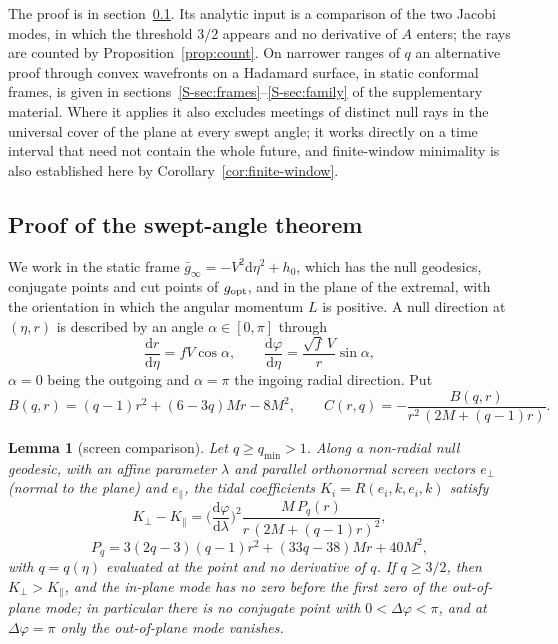 \documentclass[aip,jmp,amsmath,amssymb,reprint]{revtex4-2}
\newcommand{\dd}{\mathrm{d}}
\newcommand{\gopt}{g_{\rm opt}}
\theoremstyle{plain}
\newtheorem{lemma}[proposition]{Lemma}
\theoremstyle{definition}
\begin{document}
The proof is in section~\ref{sec:angle-proof}. Its analytic input is a comparison of the two
Jacobi modes, in which the threshold $3/2$ appears and no derivative of $A$ enters; the rays are
counted by Proposition~\ref{prop:count}. On narrower ranges of $q$ an alternative proof through
convex wavefronts on a Hadamard surface, in static conformal frames, is given in
sections~\ref{S-sec:frames}--\ref{S-sec:family} of the supplementary material. Where it applies it also excludes meetings of distinct null rays in the
universal cover of the plane at every swept angle; it works directly on a time interval that
need not contain the whole future, and finite-window minimality is also established here by
Corollary~\ref{cor:finite-window}.

\subsection{Proof of the swept-angle theorem}
\label{sec:angle-proof}
We work in the static frame $\bar g_\infty=-V^2\dd\eta^2+h_0$, which has the null geodesics,
conjugate points and cut points of $\gopt$, and in the plane of the extremal, with the
orientation in which the angular momentum $L$ is positive. A null direction at $(\eta,r)$ is
described by an angle $\alpha\in[0,\pi]$ through
\begin{equation}
  \frac{\dd r}{\dd\eta}=fV\cos\alpha,\qquad \frac{\dd\varphi}{\dd\eta}=\frac{\sqrt f\,V}{r}\sin\alpha,
  \label{eq:tk-alpha}
\end{equation}
$\alpha=0$ being the outgoing and $\alpha=\pi$ the ingoing radial direction. Put
\[
  B(q,r)=(q-1)r^2+(6-3q)Mr-8M^2,\qquad C(r,q)=-\frac{B(q,r)}{r^2\,(2M+(q-1)r)} .
\]

\begin{lemma}[screen comparison]\label{lem:tk-sturm}
Let $q\ge q_{\min}>1$. Along a non-radial null geodesic, with an affine parameter $\lambda$ and
parallel orthonormal screen vectors $e_\perp$ (normal to the plane) and $e_\parallel$, the tidal
coefficients $K_i=R(e_i,k,e_i,k)$ satisfy
\[
  K_\perp-K_\parallel=\Big(\frac{\dd\varphi}{\dd\lambda}\Big)^2\frac{M\,P_q(r)}{r\,(2M+(q-1)r)^2},
\]
\[
  P_q=3(2q-3)(q-1)r^2+(33q-38)Mr+40M^2,
\]
with $q=q(\eta)$ evaluated at the point and no derivative of $q$. If $q\ge3/2$, then
$K_\perp>K_\parallel$, and the in-plane mode has no zero before the first zero of the
out-of-plane mode; in particular there is no conjugate point with $0<\Delta\varphi<\pi$, and at
$\Delta\varphi=\pi$ only the out-of-plane mode vanishes.
\end{lemma}
\end{document}
